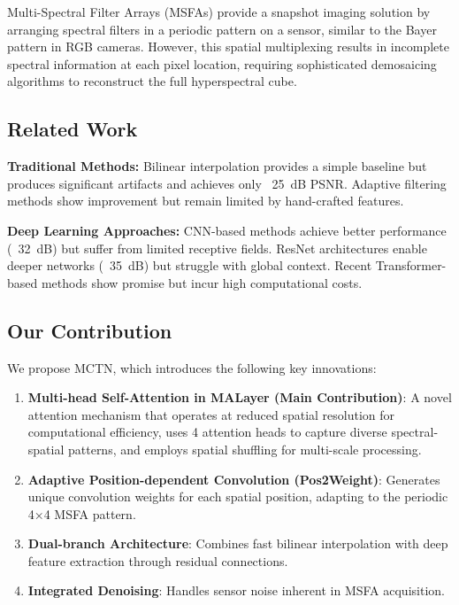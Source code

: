 \documentclass[conference]{IEEEtran}
\begin{document}
Multi-Spectral Filter Arrays (MSFAs) provide a snapshot imaging solution by arranging spectral filters in a periodic pattern on a sensor, similar to the Bayer pattern in RGB cameras. However, this spatial multiplexing results in incomplete spectral information at each pixel location, requiring sophisticated demosaicing algorithms to reconstruct the full hyperspectral cube.

\subsection{Related Work}

\textbf{Traditional Methods:}
Bilinear interpolation provides a simple baseline but produces significant artifacts and achieves only ~25~dB PSNR. Adaptive filtering methods show improvement but remain limited by hand-crafted features.

\textbf{Deep Learning Approaches:}
CNN-based methods achieve better performance (~32~dB) but suffer from limited receptive fields. ResNet architectures enable deeper networks (~35~dB) but struggle with global context. Recent Transformer-based methods show promise but incur high computational costs.

\subsection{Our Contribution}

We propose MCTN, which introduces the following key innovations:

\begin{enumerate}
    \item \textbf{Multi-head Self-Attention in MALayer (Main Contribution)}: A novel attention mechanism that operates at reduced spatial resolution for computational efficiency, uses 4 attention heads to capture diverse spectral-spatial patterns, and employs spatial shuffling for multi-scale processing.
    
    \item \textbf{Adaptive Position-dependent Convolution (Pos2Weight)}: Generates unique convolution weights for each spatial position, adapting to the periodic 4×4 MSFA pattern.
    
    \item \textbf{Dual-branch Architecture}: Combines fast bilinear interpolation with deep feature extraction through residual connections.
    
    \item \textbf{Integrated Denoising}: Handles sensor noise inherent in MSFA acquisition.
\end{enumerate}
\end{document}
